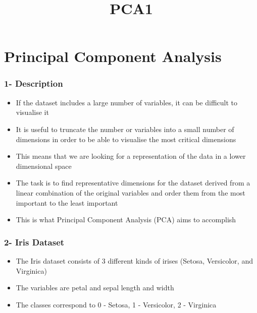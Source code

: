 \documentclass[11pt]{article}
\title{PCA1}
\providecommand{\tightlist}{%
      \setlength{\itemsep}{0pt}\setlength{\parskip}{0pt}}
\begin{document}
    
    
    \maketitle
    
    

    
    \section{Principal Component
Analysis}\label{principal-component-analysis}

    \subsubsection{1- Description}\label{description}

    \begin{itemize}
\tightlist
\item
  If the dataset includes a large number of variables, it can be
  difficult to visualise it
\item
  It is useful to truncate the number or variables into a small number
  of dimensions in order to be able to visualise the most critical
  dimensions
\item
  This means that we are looking for a representation of the data in a
  lower dimensional space
\item
  The task is to find representative dimensions for the dataset derived
  from a linear combination of the original variables and order them
  from the most important to the least important
\item
  This is what Principal Component Analysis (PCA) aims to accomplish
\end{itemize}

    \subsubsection{2- Iris Dataset}\label{iris-dataset}

    \begin{itemize}
\tightlist
\item
  The Iris dataset consists of 3 different kinds of irises (Setosa,
  Versicolor, and Virginica)
\item
  The variables are petal and sepal length and width
\item
  The classes correspond to 0 - Setosa, 1 - Versicolor, 2 - Virginica
\end{itemize}
\end{document}
